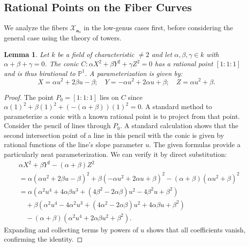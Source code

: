 \documentclass[11pt, a4paper]{amsart}
\newtheorem{lema}[thm]{Lemma}
\theoremstyle{definition}
\newcommand{\Pp}{\mathbb{P}}
\newcommand{\Xc}{\mathcal{X}}
\newcommand{\ba}{\mathbf{a}}
\begin{document}
\subsection{Rational Points on the Fiber Curves}
We analyze the fibers $\Xc_{\ba_n}$ in the low-genus cases first, before considering the general case using the theory of towers.

\begin{lema} \label{lem:conic_param}
	Let $k$ be a field of characteristic $\neq 2$ and let $\alpha, \beta, \gamma \in k$ with $\alpha+\beta+\gamma=0$. The conic $C: \alpha X^2 + \beta Y^2 + \gamma Z^2 = 0$ has a rational point $[1:1:1]$ and is thus birational to $\Pp^1$. A parameterization is given by:
	\[ X = \alpha u^2 + 2\beta u - \beta; \quad Y = -\alpha u^2 + 2\alpha u + \beta; \quad Z = \alpha u^2 + \beta. \]
\end{lema}
\begin{proof}
	The point $P_0=[1:1:1]$ lies on $C$ since $\alpha(1)^2+\beta(1)^2+(-(\alpha+\beta))(1)^2=0$. A standard method to parameterize a conic with a known rational point is to project from that point. Consider the pencil of lines through $P_0$. A standard calculation shows that the second intersection point of a line in this pencil with the conic is given by rational functions of the line's slope parameter $u$. The given formulas provide a particularly neat parameterization. We can verify it by direct substitution:
	\begin{align*}
		&\alpha X^2 + \beta Y^2 - (\alpha+\beta)Z^2 \\
		&= \alpha(\alpha u^2 + 2\beta u - \beta)^2 + \beta(-\alpha u^2 + 2\alpha u + \beta)^2 - (\alpha+\beta)(\alpha u^2 + \beta)^2 \\
		&= \alpha(\alpha^2 u^4 + 4\alpha\beta u^3 + (4\beta^2-2\alpha\beta)u^2 - 4\beta^2 u + \beta^2) \\
		&\quad + \beta(\alpha^2 u^4 - 4\alpha^2 u^3 + (4\alpha^2-2\alpha\beta)u^2 + 4\alpha\beta u + \beta^2) \\
		&\quad - (\alpha+\beta)(\alpha^2 u^4 + 2\alpha\beta u^2 + \beta^2).
	\end{align*}
	Expanding and collecting terms by powers of $u$ shows that all coefficients vanish, confirming the identity.
\end{proof}
\end{document}
